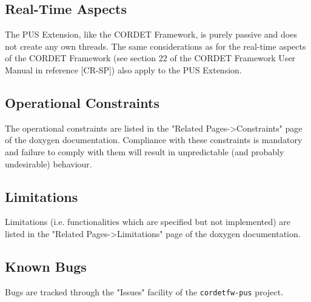 \documentclass{pnp_article}
\begin{document}
\subsection{Real-Time Aspects}
The PUS Extension, like the CORDET Framework, is purely passive and does not create any own threads. The same considerations as for the real-time aspects of the CORDET Framework (see section 22 of the CORDET Framework User Manual in reference [CR-SP]) also apply to the PUS Extension.

\subsection{Operational Constraints}
The operational constraints are listed in the "Related Pages->Constraints" page of the doxygen documentation. Compliance with these constraints is mandatory and failure to comply with them will result in unpredictable (and probably undesirable) behaviour.


\subsection{Limitations}
Limitations (i.e. functionalities which are specified but not implemented) are listed in the "Related Pages->Limitations" page of the doxygen documentation.

\subsection{Known Bugs}
Bugs are tracked through the "Issues" facility of the \texttt{cordetfw-pus} project.


\begin{landscape}


\newpage





\end{landscape}
\end{document}
